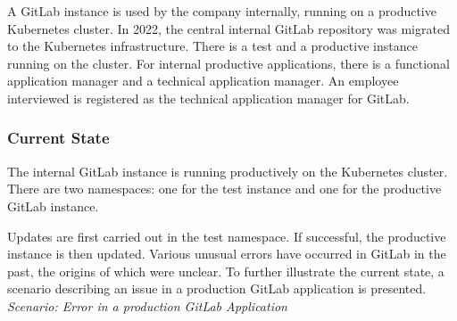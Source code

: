 \documentclass[../main.tex]{subfiles}
\begin{document}
A GitLab instance is used by the company internally, running on a productive Kubernetes cluster. In 2022, the central internal GitLab repository was migrated to the Kubernetes infrastructure. There is a test and a productive instance running on the cluster. For internal productive applications, there is a functional application manager and a technical application manager. An employee interviewed is registered as the technical application manager for GitLab.

\subsubsection{Current State}

The internal GitLab instance is running productively on the Kubernetes cluster. There are two namespaces: one for the test instance and one for the productive GitLab instance. 

Updates are first carried out in the test namespace. If successful, the productive instance is then updated. Various unusual errors have occurred in GitLab in the past, the origins of which were unclear. To further illustrate the current state, a scenario describing an issue in a production GitLab application is presented. \\

\textit{Scenario: Error in a production GitLab Application}
\end{document}
